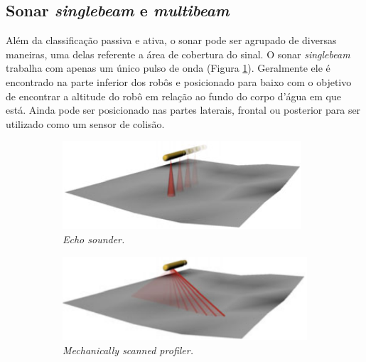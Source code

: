 \subsection{Sonar \textit{singlebeam} e \textit{multibeam}}
\label{sec:single-multibeam}
Além da classificação passiva e ativa, o sonar pode ser agrupado de diversas maneiras, uma delas referente a área de cobertura do sinal.
O sonar \textit{singlebeam} trabalha com apenas um único pulso de onda (Figura \ref{fig:echo-sounder}). Geralmente ele é encontrado na parte inferior dos robôs e posicionado para baixo com o objetivo de encontrar a altitude do robô em relação ao fundo do corpo d'água em que está. Ainda pode ser posicionado nas partes laterais, frontal ou posterior para ser utilizado como um sensor de colisão.

\begin{figure}[H]
    \centering
    \caption{Diferentes modelos de sonares.}
    \label{fig:beams}
    \begin{subfigure}[t]{0.4\textwidth}
        \includegraphics[width=\textwidth]{dados/figuras/singlebeam.png}
        \caption{\textit{Echo sounder.}}
        \label{fig:echo-sounder}
    \end{subfigure}
    \begin{subfigure}[t]{0.4\textwidth}
        \includegraphics[width=\textwidth]{dados/figuras/mec-scan-profiling.png}
        \caption{\textit{Mechanically scanned profiler.}}
        \label{fig:mec-scan-prof}
    \end{subfigure}
    \begin{subfigure}[t]{0.4\textwidth}

\end{subfigure}
\end{figure}
